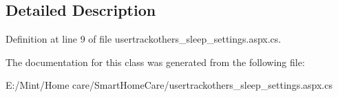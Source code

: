 \subsection{Detailed Description}


Definition at line 9 of file usertrackothers\-\_\-sleep\-\_\-settings.\-aspx.\-cs.



The documentation for this class was generated from the following file\-:\begin{DoxyCompactItemize}
\item 
E\-:/\-Mint/\-Home care/\-Smart\-Home\-Care/usertrackothers\-\_\-sleep\-\_\-settings.\-aspx.\-cs\end{DoxyCompactItemize}
